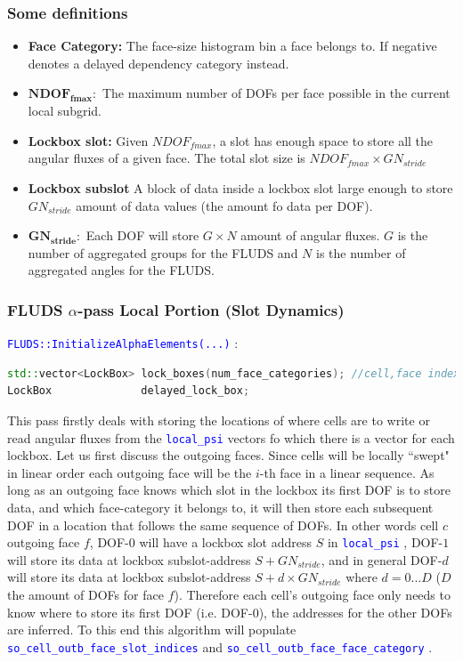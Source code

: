 \documentclass[11pt,letterpaper,titlepage]{article}
\newcommand{\xmltag}[1]{\textcolor{blue}{ \texttt{#1}} }
\numberwithin{equation}{section}
\begin{document}
\subsubsection{Some definitions}
\begin{itemize}
\item \textbf{Face Category:} The face-size histogram bin a face belongs to. If negative denotes a delayed dependency category instead.
\item $\mathbf{NDOF_{fmax}:}$ The maximum number of DOFs per face possible in the current local subgrid. 
\item \textbf{Lockbox slot:} Given $NDOF_{fmax}$, a slot has enough space to store all the angular fluxes of a given face. The total slot size is $NDOF_{fmax}{\times}GN_{stride}$
\item \textbf{Lockbox subslot} A block of data inside a lockbox slot large enough to store $GN_{stride}$ amount of data values (the amount fo data per DOF).
\item $\mathbf{GN_{stride}:}$ Each DOF will store $G{\times}N$ amount of angular fluxes. $G$ is the number of aggregated groups for the FLUDS and $N$ is the number of aggregated angles for the FLUDS.
\end{itemize}


\subsubsection{FLUDS $\alpha$-pass Local Portion (Slot Dynamics) } 
\xmltag{FLUDS::InitializeAlphaElements(...)}:
\begin{lstlisting}[language=c++]
std::vector<LockBox> lock_boxes(num_face_categories); //cell,face index pairs
LockBox              delayed_lock_box;
\end{lstlisting}
This pass firstly deals with storing the locations of where cells are to write or read angular fluxes from the \xmltag{local\_psi} vectors fo which there is a vector for each lockbox. Let us first discuss the outgoing faces. Since cells will be locally ``swept" in linear order each outgoing face will be the $i$-th face in a linear sequence. As long as an outgoing face knows which slot in the lockbox its first DOF is to store data, and which face-category it belongs to, it will then store each subsequent DOF in a location that follows the same sequence of DOFs. In other words cell $c$ outgoing face $f$, DOF-$0$ will have a lockbox slot address $S$ in \xmltag{local\_psi}, DOF-$1$ will store its data at lockbox subslot-address $S +GN_{stride}$, and in general DOF-$d$ will store its data at lockbox subslot-address $S +d{\times}GN_{stride}$ where $d=0...D$ ($D$ the amount of DOFs for face $f$). Therefore each cell's outgoing face only needs to know where to store its first DOF (i.e. DOF-$0$), the addresses for the other DOFs are inferred. To this end this algorithm will populate \xmltag{so\_cell\_outb\_face\_slot\_indices} and \xmltag{so\_cell\_outb\_face\_face\_category}.
\end{document}
